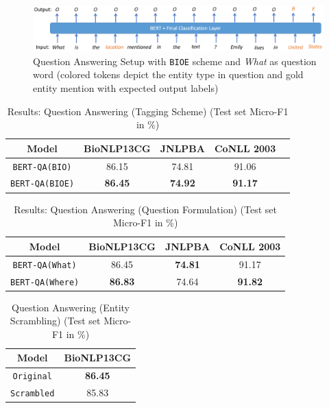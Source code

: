 \begin{figure}
    \centering
    \includegraphics[scale=0.59]{question_answering}
    \caption{Question Answering Setup with \texttt{BIOE} scheme and \textit{What} as question word (colored tokens depict the entity type in question and gold entity mention with expected output labels)}
    \label{fig:question_answering}
\end{figure}

\begin{table}[h!]
\centering
\begin{tabular}{|c|c|c|c|c|}\hline
	\textbf{Model} & \textbf{BioNLP13CG} & \textbf{JNLPBA} & \textbf{CoNLL 2003}\\\hline
	\texttt{BERT-QA(BIO)} & 86.15 & 74.81 & 91.06\\\hline
	\texttt{BERT-QA(BIOE)} & \textbf{86.45} & \textbf{74.92} & \textbf{91.17}\\\hline
	\end{tabular}
    \caption{Results: Question Answering (Tagging Scheme) (Test set Micro-F1 in \%)}
    \label{tab:res_qa_tagging}
\end{table}

\begin{table}[h!]
\centering
\begin{tabular}{|c|c|c|c|}\hline
	\textbf{Model} & \textbf{BioNLP13CG} & \textbf{JNLPBA} & \textbf{CoNLL 2003}\\\hline
	\texttt{BERT-QA(What)} & 86.45 & \textbf{74.81} & 91.17\\\hline
	\texttt{BERT-QA(Where)} & \textbf{86.83} & 74.64 & \textbf{91.82}\\\hline
	\end{tabular}
    \caption{Results: Question Answering (Question Formulation) (Test set Micro-F1 in \%)}
    \label{tab:res_qa_question}
\end{table}

\begin{table}[h!]
\centering
\begin{tabular}{|c|c|}\hline
	\textbf{Model} & \textbf{BioNLP13CG}\\\hline
	\texttt{Original} & \textbf{86.45}\\\hline
	\texttt{Scrambled} & 85.83\\\hline
	\end{tabular}
    \caption{Question Answering (Entity Scrambling) (Test set Micro-F1 in \%)}
    \label{tab:res_qa_scrable}
\end{table}

